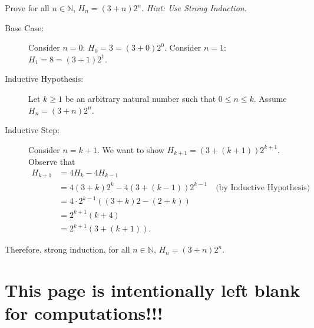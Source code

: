 \documentclass[10pt, addpoints]{exam}
\theoremstyle{definition}
\newcommand{\N}{\mathbb{N}}
\begin{document}
\begin{questions}
Prove for all $n\in \N$, $\displaystyle H_n=(3+n)2^n$.
\textit{Hint: Use Strong Induction.}

\begin{solution}
\begin{description}
\item[Base Case:] Consider $n=0$: $H_0 = 3 = (3+0)2^0$. Consider $n=1$: $H_1 = 8 = (3+1) 2^1$.
\item[Inductive Hypothesis:] Let $k\geq 1$ be an arbitrary natural number such that $0\leq n\leq k$. Assume $H_n = (3+n)2^n$.
\item[Inductive Step:] Consider $n=k+1$. We want to show $H_{k+1} = (3+(k+1))2^{k+1}$. Observe that 
\begin{align*}
H_{k+1} & = 4 H_k - 4H_{k-1}\\
&= 4(3+k)2^k -4(3+(k-1))2^{k-1} \quad \text{(by Inductive Hypothesis)}\\
&= 4\cdot 2^{k-1}((3+k)2 - (2+k))\\ 
&= 2^{k+1} (k+4)\\
& = 2^{k+1} ( 3 + (k+1)).
\end{align*}
\end{description}
Therefore, strong induction, for all $n\in \N$, $\displaystyle H_n=(3+n)2^n$.
\end{solution}
\end{questions}




%
\newpage
\section*{This page is intentionally left blank for computations!!!}

%
\end{document}

